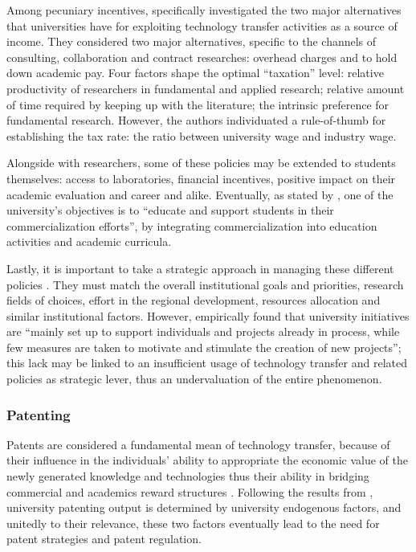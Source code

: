 Among pecuniary incentives, \citet{Beath2000} specifically investigated the two major alternatives that universities have for exploiting technology transfer activities as a source of income. They considered two major alternatives, specific to the channels of consulting, collaboration and contract researches: overhead charges and to hold down academic pay. Four factors shape the optimal \enquote{taxation} level: relative productivity of researchers in fundamental and applied research; relative amount of time required by keeping up with the literature; the intrinsic preference for fundamental research. However, the authors individuated a rule-of-thumb for establishing the tax rate: the ratio between university wage and industry wage.

Alongside with researchers, some of these policies may be extended to students themselves: access to laboratories, financial incentives, positive impact on their academic evaluation and career and alike. Eventually, as stated by \citet{Rasmussen2006}, one of the university's objectives is to \enquote{educate and support students in their commercialization efforts}, by integrating commercialization into education activities and academic curricula. 

Lastly, it is important to take a strategic approach in managing these different policies \citep{Siegel2007}. They must match the overall institutional goals and priorities, research fields of choices, effort in the regional development, resources allocation and similar institutional factors. However, \citet{Rasmussen2006} empirically found that university initiatives are \enquote{mainly set up to support individuals and projects already in process, while few measures are taken to motivate and stimulate the creation of new projects}; this lack may be linked to an insufficient usage of technology transfer and related policies as strategic lever, thus an undervaluation of the entire phenomenon.

\subsubsection{Patenting}

Patents are considered a fundamental mean of technology transfer, because of their influence in the individuals' ability to appropriate the economic value of the newly generated knowledge and technologies \citep{Bercovitz2006} thus their ability in bridging commercial and academics reward structures \citep{OwenSmith2001}. Following the results from \citet{Tijssen2006}, university patenting output is determined by university endogenous factors, and unitedly to their relevance, these two factors eventually lead to the need for patent strategies \citep{Siegel2007} and patent regulation.

